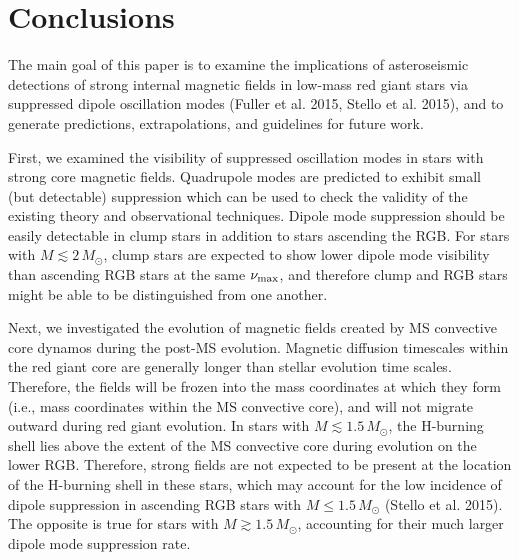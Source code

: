 \section{Conclusions}
\label{conclusion}

The main goal of this paper is to examine the implications of asteroseismic detections of strong internal magnetic fields in low-mass red giant stars via suppressed dipole oscillation modes (Fuller et al. 2015, Stello et al. 2015), and to generate predictions, extrapolations, and guidelines for future work. 

First, we examined the visibility of suppressed oscillation modes in stars with strong core magnetic fields. Quadrupole modes are predicted to exhibit small (but detectable) suppression which can be used to check the validity of the existing theory and observational techniques. Dipole mode suppression should be easily detectable in clump stars in addition to stars ascending the RGB. For stars with $M \lesssim 2 \, M_\odot$, clump stars are expected to show lower dipole mode visibility than ascending RGB stars at the same $\nu_{\rm max}$, and therefore clump and RGB stars might be able to be distinguished from one another.

Next, we investigated the evolution of magnetic fields created by MS convective core dynamos during the post-MS evolution. Magnetic diffusion timescales within the red giant core are generally longer than stellar evolution time scales. Therefore, the fields will be frozen into the mass coordinates at which they form (i.e., mass coordinates within the MS convective core), and will not migrate outward during red giant evolution. In stars with $M \lesssim 1.5 \, M_\odot$, the H-burning shell lies above the extent of the MS convective core during evolution on the lower RGB. Therefore, strong fields are not expected to be present at the location of the H-burning shell in these stars, which may account for the low incidence of dipole suppression in ascending RGB stars with $M \leq 1.5 \, M_\odot$ (Stello et al. 2015). The opposite is true for stars with $M \gtrsim 1.5 \, M_\odot$, accounting for their much larger dipole mode suppression rate.

